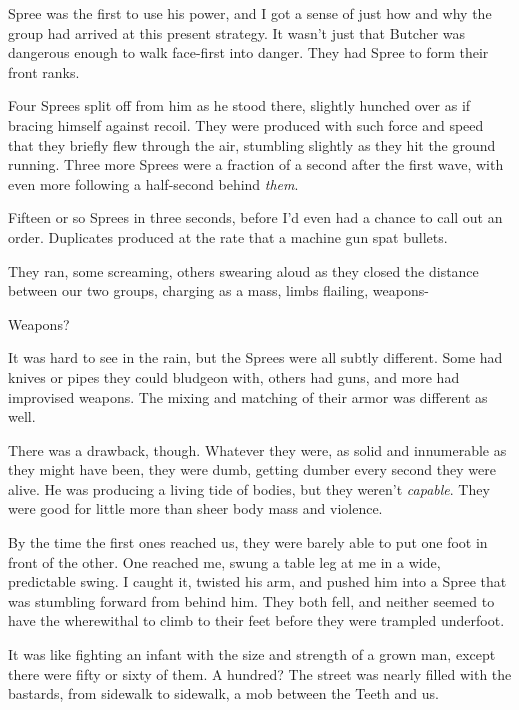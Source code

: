 Spree was the first to use his power, and I got a sense of just how and why the group had arrived at this present strategy.  It wasn't just that Butcher was dangerous enough to walk face-first into danger.  They had Spree to form their front ranks.



Four Sprees split off from him as he stood there, slightly hunched over as if bracing himself against recoil.  They were produced with such force and speed that they briefly flew through the air, stumbling slightly as they hit the ground running.  Three more Sprees were a fraction of a second after the first wave, with even more following a half-second behind \emph{them}.



Fifteen or so Sprees in three seconds, before I'd even had a chance to call out an order.  Duplicates produced at the rate that a machine gun spat bullets.



They ran, some screaming, others swearing aloud as they closed the distance between our two groups, charging as a mass, limbs flailing, weapons-



Weapons?



It was hard to see in the rain, but the Sprees were all subtly different.  Some had knives or pipes they could bludgeon with, others had guns, and more had improvised weapons.  The mixing and matching of their armor was different as well.



There was a drawback, though.  Whatever they were, as solid and innumerable as they might have been, they were dumb, getting dumber every second they were alive.  He was producing a living tide of bodies, but they weren't \emph{capable}.  They were good for little more than sheer body mass and violence.



By the time the first ones reached us, they were barely able to put one foot in front of the other.  One reached me, swung a table leg at me in a wide, predictable swing.  I caught it, twisted his arm, and pushed him into a Spree that was stumbling forward from behind him. They both fell, and neither seemed to have the wherewithal to climb to their feet before they were trampled underfoot.



It was like fighting an infant with the size and strength of a grown man, except there were fifty or sixty of them.  A hundred?  The street was nearly filled with the bastards, from sidewalk to sidewalk, a mob between the Teeth and us.



